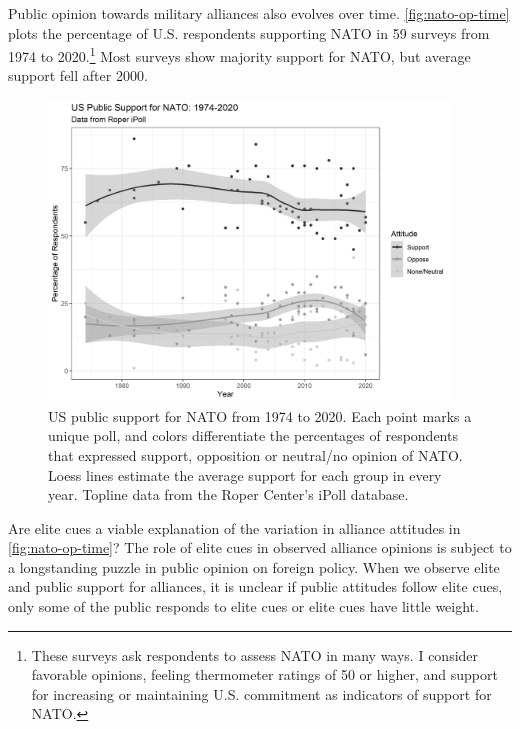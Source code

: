 \documentclass[12pt]{article}
\begin{document}
Public opinion towards military alliances also evolves over time. 
\autoref{fig:nato-op-time} plots the percentage of U.S. respondents supporting NATO in 59 surveys from 1974 to 2020.\footnote{These surveys ask respondents to assess NATO in many ways. I consider favorable opinions, feeling thermometer ratings of 50 or higher, and support for increasing or maintaining U.S. commitment as indicators of support for NATO.} 
Most surveys show majority support for NATO, but average support fell after 2000.  


\begin{figure}
	\centering
		\includegraphics[width=0.95\textwidth]{../figures/nato-op-time.png}
	\caption{US public support for NATO from 1974 to 2020. Each point marks a unique poll, and colors differentiate the percentages of respondents that expressed support, opposition or neutral/no opinion of NATO. Loess lines estimate the average support for each group in every year. Topline data from the Roper Center's iPoll database.}
	\label{fig:nato-op-time}
\end{figure}


Are elite cues a viable explanation of the variation in alliance attitudes in \autoref{fig:nato-op-time}? 
The role of elite cues in observed alliance opinions is subject to a longstanding puzzle in public opinion on foreign policy.
When we observe elite and public support for alliances, it is unclear if public attitudes follow elite cues, only some of the public responds to elite cues or elite cues have little weight. 
\end{document}
